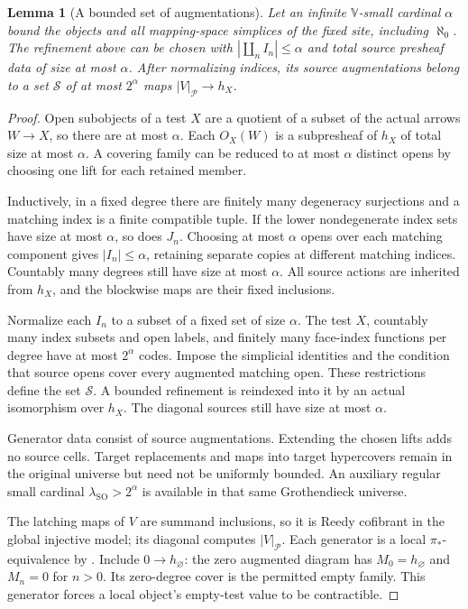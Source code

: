 \documentclass[12pt]{amsart}
\newtheorem{lem}[thm]{Lemma}
\theoremstyle{definition}
\theoremstyle{remark}
\numberwithin{equation}{section}
\begin{document}
\begin{lem}[A bounded set of augmentations]
Let an infinite $\mathbb V$-small cardinal $\alpha$
bound the objects and all mapping-space simplices
of the fixed site, including $\aleph_0$.
\label{lem:banach-split-open-size}
The refinement above can be chosen with
$|\coprod_n I_n|\le\alpha$ and total source
presheaf data of size at most $\alpha$.
After normalizing indices, its source augmentations
belong to a set $\mathscr S$ of at most $2^\alpha$
maps $|V|_{\mathcal P}\to h_X$.
\end{lem}

\begin{proof}
Open subobjects of a test $X$ are a quotient of a
subset of the actual arrows $W\to X$, so there
are at most $\alpha$. Each $O_X(W)$ is a
subpresheaf of $h_X$ of total size at most $\alpha$.
A covering family can be reduced to at most
$\alpha$ distinct opens by choosing one lift for
each retained member.

Inductively, in a fixed degree there are finitely
many degeneracy surjections and a matching index
is a finite compatible tuple. If the lower
nondegenerate index sets have size at most $\alpha$,
so does $J_n$. Choosing at most $\alpha$ opens
over each matching component gives $|I_n|\le\alpha$,
retaining separate copies at different matching
indices. Countably many degrees still have size
at most $\alpha$. All source actions are inherited
from $h_X$, and the blockwise maps are their fixed
inclusions.

Normalize each $I_n$ to a subset of a fixed set
of size $\alpha$. The test $X$, countably many
index subsets and open labels, and finitely many
face-index functions per degree have at most
$2^\alpha$ codes. Impose the simplicial identities
and the condition that source opens cover every
augmented matching open. These restrictions define
the set $\mathscr S$. A bounded refinement is
reindexed into it by an actual isomorphism over
$h_X$. The diagonal sources still have size
at most $\alpha$.

Generator data consist of source augmentations.
Extending the chosen lifts adds no source cells.
Target replacements and maps into target hypercovers
remain in the original universe but need not be
uniformly bounded. An auxiliary regular small cardinal
$\lambda_{\mathrm{SO}}>2^\alpha$ is available in that same
Grothendieck universe.

The latching maps of $V$ are summand inclusions,
so it is Reedy cofibrant in the global injective
model; its diagonal computes $|V|_{\mathcal P}$.
Each generator is a local $\pi_*$-equivalence by
\cite[Lemma~3.4.2, PDF leaves~27--28]{HAGI2005}.
Include $0\to h_\varnothing$: the zero augmented
diagram has $M_0=h_\varnothing$ and $M_n=0$ for
$n>0$. Its zero-degree cover is the permitted
empty family. This generator forces a local
object's empty-test value to be contractible.
\end{proof}
\end{document}
